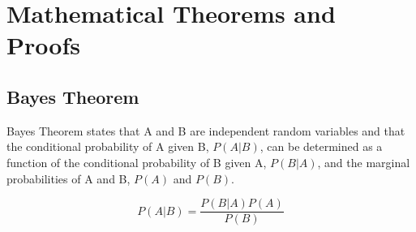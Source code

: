 \chapter{Mathematical Theorems and Proofs}
    \label{appendices:math_theorems}
    \section{Bayes Theorem}
    \label{section:bayes}

    Bayes Theorem states that A and B are independent random variables and that the conditional probability of A given B, $P(A|B)$, can be determined as a function of the conditional probability of B given A, $P(B|A)$, and the marginal probabilities of A and B, $P(A)$ and $P(B)$.

    
    \begin{equation}
        P(A|B) = \frac{P(B|A)P(A)}{P(B)}
        \label{eq:bayes}
    \end{equation}